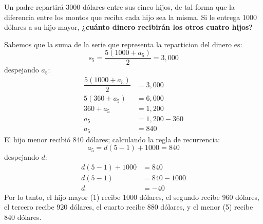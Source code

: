 Un padre repartirá 3000 dólares entre sus cinco hijos, de tal forma que la diferencia entre los montos que reciba cada hijo sea la misma.
Si le entrega 1000 dólares a su hijo mayor,
\textbf{¿cuánto dinero recibirán los otros cuatro hijos?}

\begin{solutionbox}{8cm}
    \begin{multicols}{2}
        Sabemos que la suma de la serie que representa la reparticion del dinero es:
        \[s_{5}=\dfrac{5(1000+a_{5})}{2}=3,000\]
        despejando $a_5$:
        \begin{align*}
            \dfrac{5(1000+a_{5})}{2} & =3,000     \\
            5(360+a_{5})             & =6,000     \\
            360+a_{5}                & = 1,200    \\
            a_{5}                    & =1,200-360 \\
            a_{5}                    & =840
        \end{align*}
        El hijo menor recibió 840 dólares; calculando la regla de recurrencia:
        \[a_{5}=d(5-1)+1000=840\]
        despejando $d$:
        \begin{align*}
            d(5-1)+1000 & =840      \\
            d(5-1)      & =840-1000 \\
            d           & =-40
        \end{align*}
        Por lo tanto, el hijo mayor (1) recibe 1000 dólares, el segundo recibe 960 dólares, el tercero recibe 920 dólares, el cuarto recibe 880 dólares, y el menor (5) recibe 840 dólares.
    \end{multicols}
\end{solutionbox}